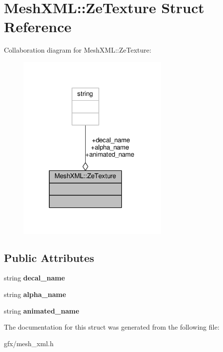 \hypertarget{structMeshXML_1_1ZeTexture}{}\section{Mesh\+X\+ML\+:\+:Ze\+Texture Struct Reference}
\label{structMeshXML_1_1ZeTexture}


Collaboration diagram for Mesh\+X\+ML\+:\+:Ze\+Texture\+:
\nopagebreak
\begin{figure}[H]
\begin{center}
\leavevmode
\includegraphics[width=212pt]{de/db8/structMeshXML_1_1ZeTexture__coll__graph}
\end{center}
\end{figure}
\subsection*{Public Attributes}
\begin{DoxyCompactItemize}
\item 
string {\bfseries decal\+\_\+name}\hypertarget{structMeshXML_1_1ZeTexture_ac4cbd231375033d42b4f5d573a0a12a4}{}\label{structMeshXML_1_1ZeTexture_ac4cbd231375033d42b4f5d573a0a12a4}

\item 
string {\bfseries alpha\+\_\+name}\hypertarget{structMeshXML_1_1ZeTexture_adfa00b0c8a746a9da826268b75d76343}{}\label{structMeshXML_1_1ZeTexture_adfa00b0c8a746a9da826268b75d76343}

\item 
string {\bfseries animated\+\_\+name}\hypertarget{structMeshXML_1_1ZeTexture_a00011737e1d27c70e502764770f79136}{}\label{structMeshXML_1_1ZeTexture_a00011737e1d27c70e502764770f79136}

\end{DoxyCompactItemize}


The documentation for this struct was generated from the following file\+:\begin{DoxyCompactItemize}
\item 
gfx/mesh\+\_\+xml.\+h\end{DoxyCompactItemize}
